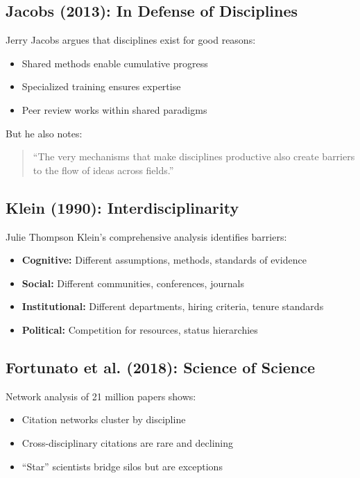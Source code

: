 \subsection{Jacobs (2013): In Defense of Disciplines}

Jerry Jacobs argues that disciplines exist for good reasons:
\begin{itemize}
\item Shared methods enable cumulative progress
\item Specialized training ensures expertise
\item Peer review works within shared paradigms
\end{itemize}

But he also notes:
\begin{quote}
``The very mechanisms that make disciplines productive also create barriers to the flow of ideas across fields.''
\end{quote}

\subsection{Klein (1990): Interdisciplinarity}

Julie Thompson Klein's comprehensive analysis identifies barriers:
\begin{itemize}
\item \textbf{Cognitive:} Different assumptions, methods, standards of evidence
\item \textbf{Social:} Different communities, conferences, journals
\item \textbf{Institutional:} Different departments, hiring criteria, tenure standards
\item \textbf{Political:} Competition for resources, status hierarchies
\end{itemize}

\subsection{Fortunato et al. (2018): Science of Science}

Network analysis of 21 million papers shows:
\begin{itemize}
\item Citation networks cluster by discipline
\item Cross-disciplinary citations are rare and declining
\item ``Star'' scientists bridge silos but are exceptions
\end{itemize}

